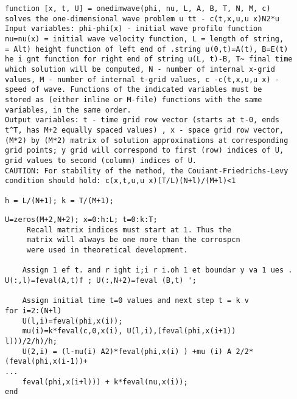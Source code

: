 \documentclass[../main.tex]{subfiles}
\begin{document}
{{\begin{lstlisting}
function [x, t, U] = onedimwave(phi, nu, L, A, B, T, N, M, c) 
solves the one-dimensional wave problem u tt - c(t,x,u,u x)N2*u 
Input variables: phi-phi(x) - initial wave profilo function 
nu=nu(x) = initial wave velocity function, L = length of string, 
= Alt) height function of left end of .string u(0,t)=A(t), B=E(t) 
he i gnt function for right end of string u(L, t)-B, T~ final time 
which solution will be computed, N - number of internal x-grid 
values, M - number of internal t-grid values, c -c(t,x,u,u x) -
speed of wave. Functions of the indicated variables must be 
stored as (either inline or M-file) functions with the same 
variables, in the same order. 
Output variables: t - time grid row vector (starts at t-0, ends 
t^T, has M+2 equally spaced values) , x - space grid row vector, 
(M*2) by (M*2) matrix of solution approximations at corresponding 
grid points; y grid will correspond to first (row) indices of U, 
grid values to second (column) indices of U. 
CAUTION: For stability of the method, the Couiant-Friedrichs-Levy 
condition should hold: c(x,t,u,u x)(T/L)(N+l)/(M+l)<1 

h = L/(N+1); k = T/(M+1); 
\end{lstlisting}

\begin{lstlisting}
U=zeros(M+2,N+2); x=0:h:L; t=0:k:T; 
	 Recall matrix indices must start at 1. Thus the 
	 matrix will always be one more than the corrospcn 
	 were used in theoretical development. 
	 
	Assign 1 ef t. and r ight i;i r i.oh 1 et boundar y va 1 ues . 
U(:,l)=feval(A,t)f ; U(:,N+2)=feval (B,t) '; 

	Assign initial time t=0 values and next step t = k v 
for i=2:(N+l) 
	U(l,i)=feval(phi,x(i)); 
	mu(i)=k*feval(c,0,x(i), U(l,i),(feval(phi,x(i+1)) 
l)))/2/h)/h; 
	U(2,i) = (l-mu(i) A2)*feval(phi,x(i) ) +mu (i) A 2/2* (feval(phi,x(i-1))+
...
	feval(phi,x(i+l))) + k*feval(nu,x(i));  	 
end 


\end{lstlisting}}}
\end{document}
